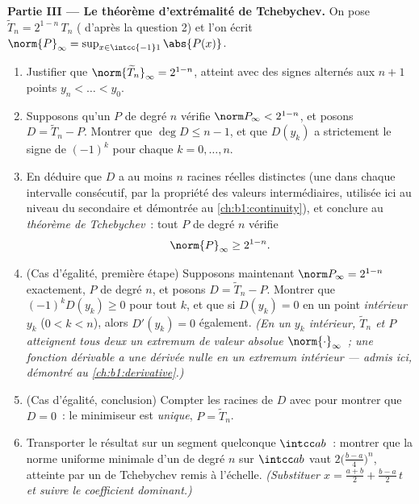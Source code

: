 \begin{problem}
\medskip
\noindent\textbf{Partie III --- Le théorème d'extrémalité de
Tchebychev.}
On pose $\widetilde T_n = 2^{1-n}\,T_n$ ( d'après la
question 2) et l'on écrit $\norm{P}_\infty = \sup_{x \in
\intcc{-1}1}\abs{P(x)}$.
\begin{enumerate}[resume]
  \item Justifier que $\norm{\widetilde T_n}_\infty = 2^{1-n}$,
        atteint avec des signes alternés aux $n + 1$ points $y_n <
        \dots < y_0$.
  \item Supposons qu'un  $P$ de degré $n$ vérifie
        $\norm P_\infty < 2^{1-n}$, et posons $D = \widetilde T_n -
        P$. Montrer que $\deg D \leq n - 1$, et que $D(y_k)$ a
        strictement le signe de $(-1)^k$ pour chaque $k = 0, \dots,
        n$.
  \item En déduire que $D$ a au moins $n$ racines réelles distinctes
        (une dans chaque intervalle consécutif, par la propriété des
        valeurs intermédiaires, utilisée ici au niveau du secondaire et
        démontrée au \cref{ch:b1:continuity}), et conclure au
        \emph{théorème de Tchebychev}~: tout  $P$
        de degré $n$ vérifie
        \[
        \norm{P}_\infty \geq 2^{1-n} .
        \]
  \item (Cas d'égalité, première étape) Supposons maintenant $\norm
        P_\infty = 2^{1-n}$ exactement, $P$  de degré $n$,
        et posons $D = \widetilde T_n - P$. Montrer que
        $(-1)^kD(y_k) \geq 0$ pour tout $k$, et que si $D(y_k) = 0$
        en un point \emph{intérieur} $y_k$ ($0 < k < n$), alors
        $D'(y_k) = 0$ également. \emph{(En un $y_k$ intérieur,
        $\widetilde T_n$ et $P$ atteignent tous deux un extremum de
        valeur absolue $\norm{\cdot}
        _\infty$~; une fonction dérivable a une dérivée nulle en un
        extremum intérieur --- admis ici, démontré
        au \cref{ch:b1:derivative}.)}
  \item (Cas d'égalité, conclusion) Compter les racines de $D$ avec
         pour montrer que $D = 0$~: le minimiseur est
        \emph{unique}, $P = \widetilde T_n$.
  \item Transporter le résultat sur un segment quelconque $\intcc
        ab$~: montrer que la norme uniforme minimale d'un  de degré $n$ sur $\intcc ab$ vaut
        $2\bigl(\frac{b-a}4\bigr)^n$, atteinte par un  de
        Tchebychev remis à l'échelle. \emph{(Substituer $x =
        \frac{a+b}2 + \frac{b-a}2\,t$ et suivre le coefficient
        dominant.)}
\end{enumerate}


\end{problem}
